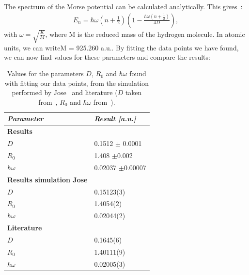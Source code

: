 The spectrum of the Morse potential can be calculated analytically. This gives~\cite{jose_pdf}:
\begin{align}
{E_n} = \hbar \omega \left( {n + \frac{1}{2}} \right)\left( {1 - \frac{{\hbar \omega \left( {n + \frac{1}{2}} \right)}}{{4D}}} \right),
\end{align}
with $\omega=\sqrt{\frac{K}{M}}$, where M is the reduced mass of the hydrogen molecule. In atomic units, we can write\newline M = 925.260 a.u.\cite{hyplink}. By fitting the data points we have found, we can now find values for these parameters and compare the results:
\begin{table}[H]
\centering
\begin{tabular}{|l|l|}
\hline
\textit{Parameter} & \textit{Result {[}a.u.{]}} \\ \hline
\textbf{Results}   &                            \\\hline
$D$                  & 0.1512 $\pm$ 0.0001              \\\hline
$R_0$                 & 1.408  $\pm$0.002              \\\hline
$\hbar\omega$               & 0.02037 $\pm$0.00007                            \\\hline
\textbf{Results simulation Jose}                   &                            \\\hline
$D$                   &       0.15123(3)                     \\\hline
$R_0$                   &           1.4054(2)                 \\\hline
 $\hbar\omega$                  &      0.02044(2)                      \\\hline
 \textbf{Literature}                  &                            \\\hline
  $D$                 &   0.1645(6)                         \\\hline
    $R_0$               &      1.40111(9)                      \\\hline
     $\hbar\omega$               &     0.02005(3)          \\          
     \hline
\end{tabular}
\caption{Values for the parameters $D$, $R_0$ and $\hbar\omega$ found with fitting our data points, from the simulation performed by Jose~\cite{jose_pdf} and literature ($D$ taken from~\cite{traynor1991}, $R_0$ and $\hbar\omega$ from~\cite{jose_pdf}).}
\end{table}
\newpage
